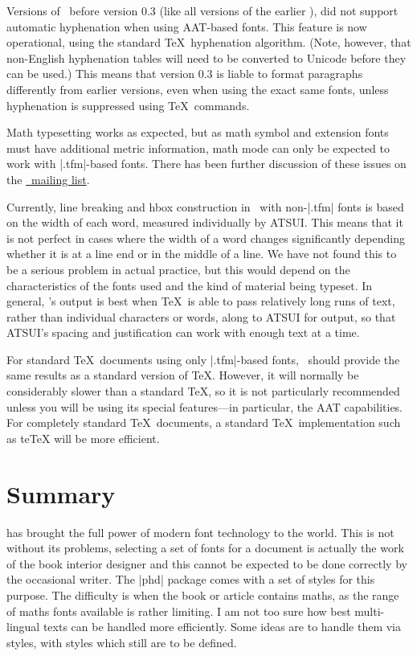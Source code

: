 Versions of \XeTeX\ before version 0.3 (like all versions of the earlier \TeXgX), did not support automatic hyphenation when using AAT-based fonts. This feature is now operational, using the standard \TeX\ hyphenation algorithm. (Note, however, that non-English hyphenation tables will need to be converted to Unicode before they can be used.) This means that version 0.3 is liable to format paragraphs differently from earlier versions, even when using the exact same fonts, unless hyphenation is suppressed using \TeX\ commands.

Math typesetting works as expected, but as math symbol and extension fonts must have additional metric information, math mode can only be expected to work with |.tfm|-based fonts. There has been further discussion of these issues on the \href{http://tug.org/mailman/listinfo/xetex}{\XeTeX\ mailing list}.

Currently, line breaking and hbox construction in \XeTeX\ with non-|.tfm| fonts is based on the width of each word, measured individually by ATSUI. This means that it is not perfect in cases where the width of a word changes significantly depending whether it is at a line end or in the middle of a line. We have not found this to be a serious problem in actual practice, but this would depend on the characteristics of the fonts used and the kind of material being typeset. In general, \XeTeX’s output is best when \TeX\ is able to pass relatively long runs of text, rather than individual characters or words, along to ATSUI for output, so that ATSUI's spacing and justification can work with enough text at a time.

For standard \TeX\ documents using only |.tfm|-based fonts, \XeTeX\ should provide the same results as a standard version of \TeX. However, it will normally be considerably slower than a standard \TeX, so it is not particularly recommended unless you will be using its special features—in particular, the AAT capabilities. For completely standard \TeX\ documents, a standard \TeX\ implementation such as teTeX will be more efficient.

\section{Summary}


\XeTeX has brought the full power of modern font technology to the \tex world. This is not without its problems, selecting a set of fonts for a document is actually the work of the book interior designer and this cannot be expected to be done correctly by the occasional writer. The |phd| package comes with a set
of styles for this purpose. The difficulty is when the book or article contains maths, as the range of maths fonts available is rather limiting. I am not too sure how best multi-lingual texts can be handled more efficiently. Some ideas are to handle them via styles, with styles which still are to be defined.




